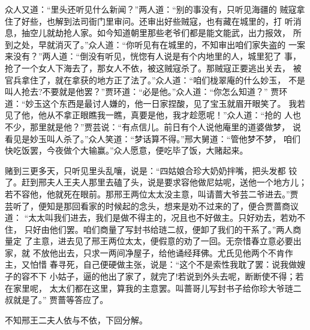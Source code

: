 众人又道：“里头还听见什么新闻？”两人道：“别的事没有，只听见海疆的
贼寇拿住了好些，也解到法司衙门里审问。还审出好些贼寇，也有藏在城里的，打
听消息，抽空儿就劫抢人家。如今知道朝里那些老爷们都是能文能武，出力报效，
所到之处，早就消灭了。”众人道：“你听见有在城里的，不知审出咱们家失盗的
一案来没有？”两人道：“倒没有听见，恍惚有人说是有个内地里的人，城里犯了
事，抢了一个女人下海去了，那女人不依，被这贼寇杀了。那贼寇正要逃出关去，
被官兵拿住了，就在拿获的地方正了法了。”众人道：“咱们栊翠庵的什么妙玉，
不是叫人抢去?不要就是他罢？”贾环道：“必是他。”众人道：“你怎么知道？”
贾环道：“妙玉这个东西是最讨人嫌的，他一日家捏酸，见了宝玉就眉开眼笑了。
我若见了他，他从不拿正眼瞧我一瞧，真要是他，我才趁愿呢！”众人道：“抢的
人也不少，那里就是他？”贾芸说：“有点信儿。前日有个人说他庵里的道婆做梦，
说看见是妙玉叫人杀了。”众人笑道：“梦话算不得。”邢大舅道：“管他梦不梦，
咱们快吃饭罢，今夜做个大输赢。”众人愿意，便吃毕了饭，大赌起来。

赌到三更多天，只听见里头乱嚷，说是：“四姑娘合珍大奶奶拌嘴，把头发都
铰了。赶到邢夫人王夫人那里去磕了头，说是要求容他做尼姑呢，送他一个地方儿；
若不容他，他就死在眼前。那邢王两位太太没主意，叫请蔷大爷芸二爷进去。”贾
芸听了，便知是那回看家的时候起的念头，想来是劝不过来的了，便合贾蔷商议道：
“太太叫我们进去，我们是做不得主的，况且也不好做主。只好劝去，若劝不住，
只好由他们罢。咱们商量了写封书给琏二叔，便卸了我们的干系了。”两人商量定
了主意，进去见了邢王两位太太，便假意的劝了一回。无奈惜春立意必要出家，就
不放他出去，只求一两间净屋子，给他诵经拜佛。尤氏见他两个不肯作主，又怕惜
春寻死，自己便硬做主张，说是：“这个不是索性我耽了罢：说我做嫂子的容不下
小姑子，逼的他出了家了，就完了!若说到外头去呢，断断使不得；若在家里呢，
太太们都在这里，算我的主意罢。叫蔷哥儿写封书子给你珍大爷琏二叔就是了。”
贾蔷等答应了。

不知邢王二夫人依与不依，下回分解。